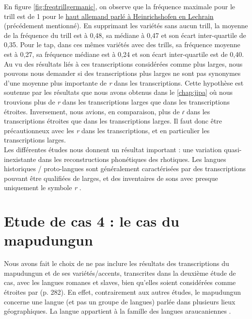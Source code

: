 En figure \ref{fig:freqtrillgermanic}, on observe que la fréquence maximale pour le trill est de 1 pour le \href{https://soundcomparisons.com/#/en/Germanic/language/Gmc_W_GHgh_Alm_Lech_Heinrichshofen_Dl}{haut allemand parlé à Heinrichshofen en Lechrain} (précédement mentionné).
En supprimant les variétés sans aucun trill, la moyenne de la fréquence du trill est à 0,48, sa médiane à 0,47 et son écart inter-quartile de 0,35.
Pour le tap, dans ces mêmes variétés avec des trills, sa fréquence moyenne est à 0,27, sa fréquence médiane est à 0,24 et son écart inter-quartile est de 0,40.\\

Au vu des résultats liés à ces transcriptions considérées comme plus larges, nous pouvons nous demander si des transcriptions plus larges ne sont pas synonymes d'une moyenne plus importante de \textit{r} dans les transcriptions. Cette hypothèse est soutenue par les résultats que nous avons obtenus dans le \autoref{chap:jipa} où nous trouvions plus de \textit{r} dans les transcriptions larges que dans les transcriptions étroites. Inversement, nous avions, en comparaison, plus de \textit{ɾ} dans les transcriptions étroites que dans les transcriptions larges. Il faut donc être précautionneux avec les \textit{r} dans les transcriptions, et en particulier les transcriptions larges. \\

Les différentes études nous donnent un résultat important : une variation quasi-inexistante dans les reconstructions phonétiques des rhotiques. Les langues historiques / proto-langues sont généralement caractérisées par des transcriptions pouvant être qualifiées de larges, et des inventaires de sons avec presque uniquement le symbole \textit{r} \parencite{marsicoBDPROTODatabasePhonological2018}.

\section{Etude de cas 4 : le cas du mapudungun \parencite{aninao_sound_2019}}

Nous avons fait le choix de ne pas inclure les résultats des transcriptions du mapudungun et de ses variétés/accents, transcrites dans la deuxième étude de cas, avec les langues romanes et slaves, bien qu'elles soient considérées comme étroites par \textcite{heggartySoundComparisonsNew2019} (p. 282). En effet, contrairement aux autres études, le mapudungun concerne une langue (et pas un groupe de langues) parlée dans plusieurs lieux géographiques. La langue appartient à la famille des langues araucaniennes .

